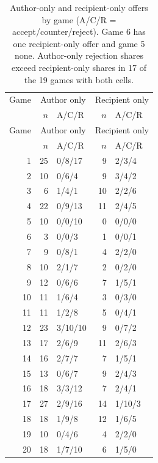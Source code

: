 \begin{longtable}{@{}rrlrl@{}}
\caption{Author-only and recipient-only offers by game (A/C/R = accept/counter/reject). Game 6 has one recipient-only offer and game 5 none. Author-only rejection shares exceed recipient-only shares in 17 of the 19 games with both cells.}\label{tab:app-games}\\
\toprule Game & \multicolumn{2}{c}{Author only} & \multicolumn{2}{c}{Recipient only}\\
& $n$ & A/C/R & $n$ & A/C/R\\\midrule\endfirsthead
\toprule Game & \multicolumn{2}{c}{Author only} & \multicolumn{2}{c}{Recipient only}\\
& $n$ & A/C/R & $n$ & A/C/R\\\midrule\endhead
1 & 25 & 0/8/17 & 9 & 2/3/4\\
2 & 10 & 0/6/4 & 9 & 3/4/2\\
3 & 6 & 1/4/1 & 10 & 2/2/6\\
4 & 22 & 0/9/13 & 11 & 2/4/5\\
5 & 10 & 0/0/10 & 0 & 0/0/0\\
6 & 3 & 0/0/3 & 1 & 0/0/1\\
7 & 9 & 0/8/1 & 4 & 2/2/0\\
8 & 10 & 2/1/7 & 2 & 0/2/0\\
9 & 12 & 0/6/6 & 7 & 1/5/1\\
10 & 11 & 1/6/4 & 3 & 0/3/0\\
11 & 11 & 1/2/8 & 5 & 0/4/1\\
12 & 23 & 3/10/10 & 9 & 0/7/2\\
13 & 17 & 2/6/9 & 11 & 2/6/3\\
14 & 16 & 2/7/7 & 7 & 1/5/1\\
15 & 13 & 0/6/7 & 9 & 2/4/3\\
16 & 18 & 3/3/12 & 7 & 2/4/1\\
17 & 27 & 2/9/16 & 14 & 1/10/3\\
18 & 18 & 1/9/8 & 12 & 1/6/5\\
19 & 10 & 0/4/6 & 4 & 2/2/0\\
20 & 18 & 1/7/10 & 6 & 1/5/0\\
\bottomrule
\end{longtable}
